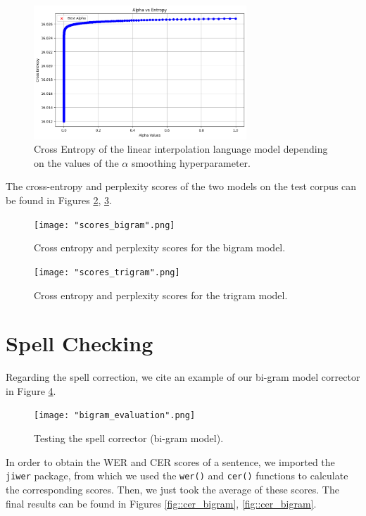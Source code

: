 \documentclass[11pt, a4paper]{article}
\begin{document}
	
	\begin{figure}
		\centering
		\includegraphics[width=8cm]{"interpolation_alpha.png"}
		\caption{Cross Entropy of the linear interpolation language model depending on the values of the $\alpha$ smoothing hyperparameter.}
		\label{fig::li_alpha_entropy}
	\end{figure}


	The cross-entropy and perplexity scores of the two models on the test corpus can be found in Figures \ref{fig::scores_bigram}, \ref{fig::scores_trigram}.

	\begin{figure}
	    \centering
	    \texttt{[image: "scores\_bigram".png]}
	    \caption{Cross entropy and perplexity scores for the bigram model.}
	    \label{fig::scores_bigram}
	\end{figure}
	
	\begin{figure}
	    \centering
	    \texttt{[image: "scores\_trigram".png]}
	    \caption{Cross entropy and perplexity scores for the trigram model.}
	    \label{fig::scores_trigram}
	\end{figure}


	
	\section{Spell Checking}
	
	
	Regarding the spell correction, we cite an example of our bi-gram model corrector in Figure \ref{fig::spell_check_example}.
	
	 \begin{figure}
	    \centering
	    \texttt{[image: "bigram\_evaluation".png]}
	    \label{fig::spell_check_example}
	    \caption{Testing the spell corrector (bi-gram model).}
	\end{figure}
 
	In order to obtain the WER and CER scores of a sentence, we imported the \texttt{jiwer} package, from which we used the \texttt{wer()} and \texttt{cer()} functions to calculate the corresponding scores. Then, we just took the average of these scores. The final results can be found in Figures \ref{fig::cer_bigram}, \ref{fig::cer_bigram}.
	
\end{document}
